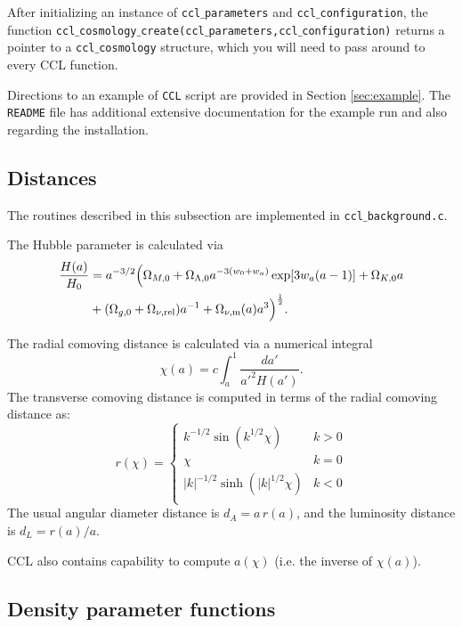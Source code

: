 \documentclass[\docopts]{\docclass}
\begin{document}
After initializing an instance of {\tt ccl$\_$parameters} and {\tt ccl$\_$configuration}, the function {\tt ccl$\_$cosmology$\_$create(ccl$\_$parameters,ccl$\_$configuration)} returns a pointer to a {\tt ccl$\_$cosmology} structure, which you will need to pass around to every CCL function.

Directions to an example of {\tt CCL} script are provided in Section \ref{sec:example}. The {\tt README} file has additional extensive documentation for the example run and also regarding the installation.

\subsection{Distances}
\label{sec:distances}

The routines described in this subsection are implemented in {\tt ccl$\_$background.c}.

The Hubble parameter is calculated via
%
\begin{align}\label{eq:Ha}
\frac{H(a)}{H_0} &= a^{-3/2}\Big(\Omega_{M,0}+\Omega_{\Lambda,0} a^{-3(w_0+w_a)}
    \exp[3 w_a (a-1)]+\Omega_{K,0} a \nonumber \\ &+(\Omega_{g,0} + \Omega_{\nu, {\rm rel}}) a^{-1} + \Omega_{\nu, {\rm m}}(a)a^3\Big)^{\frac{1}{2}}.
\end{align}

The radial comoving distance is calculated via a numerical integral
\begin{equation}
 \chi(a)= c \int_a^1 \frac{da'}{a'^2 H(a')}.
\end{equation}
The transverse comoving distance is computed in terms of the radial comoving distance as:
\begin{equation}\label{eq:angdist}
 r(\chi)=\left\{\begin{array}{cc}
                 k^{-1/2}\sin(k^{1/2}\chi) & k>0\\
                 \chi & k=0\\
                 |k|^{-1/2}\sinh(|k|^{1/2}\chi) & k<0\\
                \end{array}\right.
\end{equation}
The usual angular diameter distance is $d_A=a\,r(a)$, and the luminosity distance is
$d_L=r(a)/a$.

CCL also contains capability to compute $a(\chi)$ (i.e. the inverse of $\chi(a)$).


\subsection{Density parameter functions}
\label{subsec:densityparam}
\end{document}
